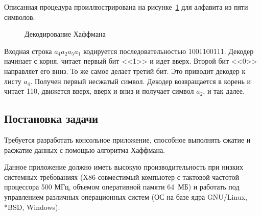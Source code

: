 Описанная процедура проиллюстрирована на рисунке~\ref{pic:huffman_de}
для алфавита из пяти символов. 

\begin{figure}[h]
  \centering
  {
    \setlength{\fboxsep}{0pt}%
    \setlength{\fboxrule}{1pt}%
  }
  \caption{Декодирование Хаффмана}
  \label{pic:huffman_de}
\end{figure}

Входная строка $a_4a_2a_5a_1$ кодируется
последовательностью 1001100111. Декодер начинает с корня, читает первый
бит <<1>> и идет вверх. Второй бит <<0>> направляет его вниз. 
То же самое делает третий бит. Это приводит декодер к листу $a_4$.
Получен первый несжатый символ. Декодер возвращается в корень и читает
110, движется вверх, вверх и вниз и получает символ $a_2$, и так далее.

\subsection{Постановка задачи}

Требуется разработать консольное приложение, способное
выполнять сжатие и расжатие данных с помощью алгоритма Хаффмана.

Данное приложение должно иметь высокую производительность при 
низких системных требованиях
(X86-совместимый компьютер с тактовой
частотой процессора 500 МГц,
объемом оперативной памяти 64~МБ) 
и работать под управлением различных операционных систем
(ОС на базе ядра GNU/Linux, *BSD, Windows).


